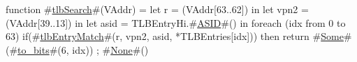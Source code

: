 function #\hyperref[ztlbSearch]{tlbSearch}#(VAddr) =
  let r    = (VAddr[63..62]) in
  let vpn2 = (VAddr[39..13]) in
  let asid = TLBEntryHi.#\hyperref[zASID]{ASID}#() in {
    foreach (idx from 0 to 63) {
      if(#\hyperref[ztlbEntryMatch]{tlbEntryMatch}#(r, vpn2, asid, *TLBEntries[idx])) then
	return #\hyperref[zSome]{Some}#(#\hyperref[ztozybits]{to\_bits}#(6, idx))
    };
    #\hyperref[zNone]{None}#()
  }

